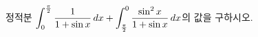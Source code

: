 정적분 $\displaystyle\int_{0}^{\frac{\pi}{2}}\dfrac{1}{1+\sin x}\mkern3mu dx+\int_{\frac{\pi}{2}}^{0}\dfrac{\sin^2 x}{1+\sin x}\mkern3mu dx$의 값을 구하시오.
